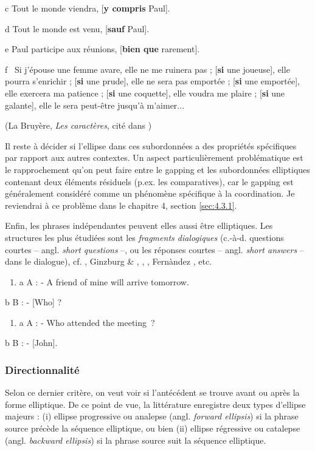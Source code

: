   c  Tout le monde viendra, [\textbf{y compris} Paul].

  d  Tout le monde est venu, [\textbf{sauf} Paul].

  e  Paul participe aux réunions, [\textbf{bien que} rarement].

  f  {\guillemotleft}~Si j'épouse une femme avare, elle ne me ruinera pas ; [\textbf{si} une joueuse], elle pourra s'enrichir ; [\textbf{si} une prude], elle ne sera pas emportée ; [\textbf{si} une emportée], elle exercera ma patience ; [\textbf{si} une coquette], elle voudra me plaire ; [\textbf{si} une galante], elle le sera peut-être jusqu'à m'aimer...~{\guillemotright}

{\raggedleft
    (La Bruyère, \textit{Les caractères}, cité dans \citet{Piot1988})  
}

Il reste à décider si l'ellipse dans ces subordonnées a des propriétés spécifiques par rapport aux autres contextes. Un aspect particulièrement problématique est le rapprochement qu'on peut faire entre le gapping et les subordonnées elliptiques contenant deux éléments résiduels (p.ex. les comparatives), car le gapping est généralement considéré comme un phénomène spécifique à la coordination. Je reviendrai à ce problème dans le chapitre 4, section \ref{sec:4.3.1}.  

Enfin, les phrases indépendantes peuvent elles aussi être elliptiques. Les structures les plus étudiées sont les \textit{fragments dialogiques} (c.-à-d. questions courtes  -- angl. \textit{short questions} --, ou les réponses courtes  -- angl. \textit{short answers} -- dans le dialogue), cf. \citet{Barton1990}, Ginzburg \& \citet{Sag2000}, \citet{Schlangen2003}, \citet{Merchant2004}, Fernàndez \citet{Rovira2006}, etc.  


\begin{enumerate}
\item \label{bkm:Ref306121981}a  A : - A friend of mine will arrive tomorrow. 


\end{enumerate}
  b  B : - [Who] ?  


\begin{enumerate}
\item \label{bkm:Ref306122023}a  A : - Who attended the meeting~? 


\end{enumerate}
  b  B : - [John].  

\subsubsection{Directionnalité~}
Selon ce dernier critère, on veut voir si l'antécédent se trouve avant ou après la forme elliptique. De ce point de vue, la littérature enregistre deux types d'ellipse majeurs : (i) ellipse progressive ou analepse (angl. \textit{forward ellipsis}) si la phrase source précède la séquence elliptique, ou bien (ii) ellipse régressive ou catalepse (angl. \textit{backward ellipsis}) si la phrase source suit la séquence elliptique.

